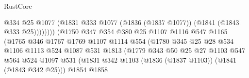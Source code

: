 \begin{lexlean}{RustCore}
\begin{coremodule}
                                              @334
                                              @25
                                              @1077
                                              (@1831
                                                @333
                                                @1077
                                                (@1836 (@1837 @1077))
                                                (@1841 (@1843 @333 @25))))))))
                                    (@1750
                                      @347
                                      @354
                                      @380
                                      @25
                                      @1107
                                      @1116
                                      @547
                                      @1165
                                      (@1765
                                        @346
                                        @1767
                                        @1769
                                        @1107
                                        @1114
                                        @554
                                        (@1780
                                          @345
                                          @25
                                          @28
                                          @534
                                          @1106
                                          @1113
                                          @524
                                          @1087
                                          @531
                                          @1813
                                          (@1779
                                            @343
                                            @50
                                            @25
                                            @27
                                            @1103
                                            @547
                                            @564
                                            @524
                                            @1097
                                            @531
                                            (@1831
                                              @342
                                              @1103
                                              (@1836 (@1837 @1103))
                                              (@1841 (@1843 @342 @25)))
                                            @1854
                                            @1858

\end{coremodule}
\end{lexlean}
